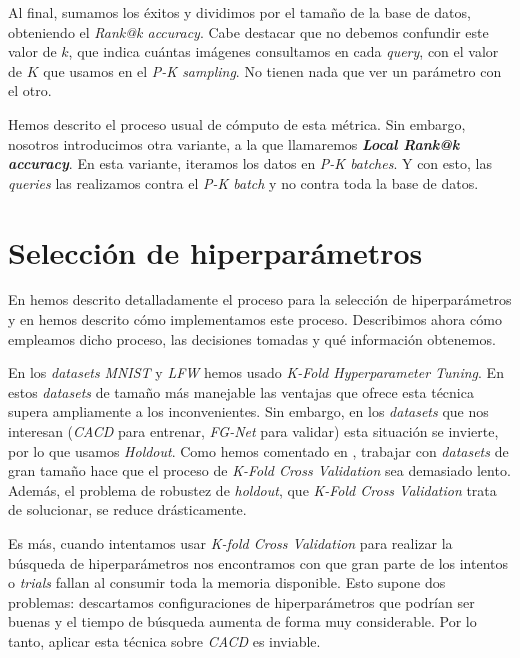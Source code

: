 Al final, sumamos los éxitos y dividimos por el tamaño de la base de datos, obteniendo el \textit{Rank@k accuracy}. Cabe destacar que no debemos confundir este valor de $k$, que indica cuántas imágenes consultamos en cada \textit{query}, con el valor de $K$ que usamos en el \textit{P-K sampling}. No tienen nada que ver un parámetro con el otro.

Hemos descrito el proceso usual de cómputo de esta métrica. Sin embargo, nosotros introducimos otra variante, a la que llamaremos \textbf{\textit{Local Rank@k accuracy}}. En esta variante, iteramos los datos en \textit{P-K batches}. Y con esto, las \textit{queries} las realizamos contra el \textit{P-K batch} y no contra toda la base de datos.

\section{Selección de hiperparámetros} \label{isec:experimentacion_hp_tuning}

En  hemos descrito detalladamente el proceso para la selección de hiperparámetros y en  hemos descrito cómo implementamos este proceso. Describimos ahora cómo empleamos dicho proceso, las decisiones tomadas y qué información obtenemos.

En los \textit{datasets} \textit{MNIST} y \textit{LFW} hemos usado \textit{K-Fold Hyperparameter Tuning}. En estos \textit{datasets} de tamaño más manejable las ventajas que ofrece esta técnica supera ampliamente a los inconvenientes. Sin embargo, en los \textit{datasets} que nos interesan (\textit{CACD} para entrenar, \textit{FG-Net} para validar) esta situación se invierte, por lo que usamos \textit{Holdout}. Como hemos comentado en , trabajar con \textit{datasets} de gran tamaño hace que el proceso de \textit{K-Fold Cross Validation} sea demasiado lento. Además, el problema de robustez de \textit{holdout}, que \textit{K-Fold Cross Validation} trata de solucionar, se reduce drásticamente.

Es más, cuando intentamos usar \textit{K-fold Cross Validation} para realizar la búsqueda de hiperparámetros nos encontramos con que gran parte de los intentos o \textit{trials} fallan al consumir toda la memoria disponible. Esto supone dos problemas: descartamos configuraciones de hiperparámetros que podrían ser buenas y el tiempo de búsqueda aumenta de forma muy considerable. Por lo tanto, aplicar esta técnica sobre \textit{CACD} es inviable.

